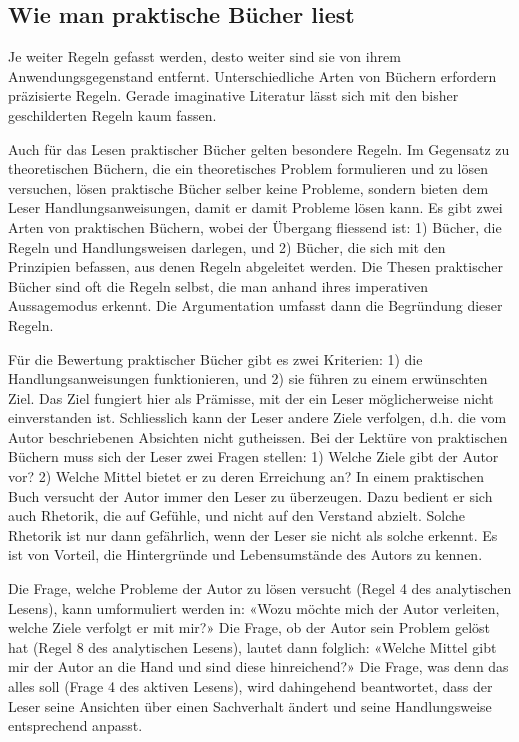 \documentclass[a4paper,12pt]{scrartcl}
\begin{document}
\subsection{Wie man praktische Bücher liest}

Je weiter Regeln gefasst werden, desto weiter sind sie von ihrem Anwendungsgegenstand entfernt. Unterschiedliche Arten von Büchern erfordern präzisierte Regeln. Gerade imaginative Literatur lässt sich mit den bisher geschilderten Regeln kaum fassen.

Auch für das Lesen praktischer Bücher gelten besondere Regeln. Im Gegensatz zu theoretischen Büchern, die ein theoretisches Problem formulieren und zu lösen versuchen, lösen praktische Bücher selber keine Probleme, sondern bieten dem Leser Handlungsanweisungen, damit er damit Probleme lösen kann. Es gibt zwei Arten von praktischen Büchern, wobei der Übergang fliessend ist: 1) Bücher, die Regeln und Handlungsweisen darlegen, und 2) Bücher, die sich mit den Prinzipien befassen, aus denen Regeln abgeleitet werden. Die Thesen praktischer Bücher sind oft die Regeln selbst, die man anhand ihres imperativen Aussagemodus erkennt. Die Argumentation umfasst dann die Begründung dieser Regeln.

Für die Bewertung praktischer Bücher gibt es zwei Kriterien: 1) die Handlungsanweisungen funktionieren, und 2) sie führen zu einem erwünschten Ziel. Das Ziel fungiert hier als Prämisse, mit der ein Leser möglicherweise nicht einverstanden ist. Schliesslich kann der Leser andere Ziele verfolgen, d.h. die vom Autor beschriebenen Absichten nicht gutheissen. Bei der Lektüre von praktischen Büchern muss sich der Leser zwei Fragen stellen: 1) Welche Ziele gibt der Autor vor? 2) Welche Mittel bietet er zu deren Erreichung an? In einem praktischen Buch versucht der Autor immer den Leser zu überzeugen. Dazu bedient er sich auch Rhetorik, die auf Gefühle, und nicht auf den Verstand abzielt. Solche Rhetorik ist nur dann gefährlich, wenn der Leser sie nicht als solche erkennt. Es ist von Vorteil, die Hintergründe und Lebensumstände des Autors zu kennen.

Die Frage, welche Probleme der Autor zu lösen versucht (Regel 4 des analytischen Lesens), kann umformuliert werden in: «Wozu möchte mich der Autor verleiten, welche Ziele verfolgt er mit mir?» Die Frage, ob der Autor sein Problem gelöst hat (Regel 8 des analytischen Lesens), lautet dann folglich: «Welche Mittel gibt mir der Autor an die Hand und sind diese hinreichend?» Die Frage, was denn das alles soll (Frage 4 des aktiven Lesens), wird dahingehend beantwortet, dass der Leser seine Ansichten über einen Sachverhalt ändert und seine Handlungsweise entsprechend anpasst.
\end{document}
